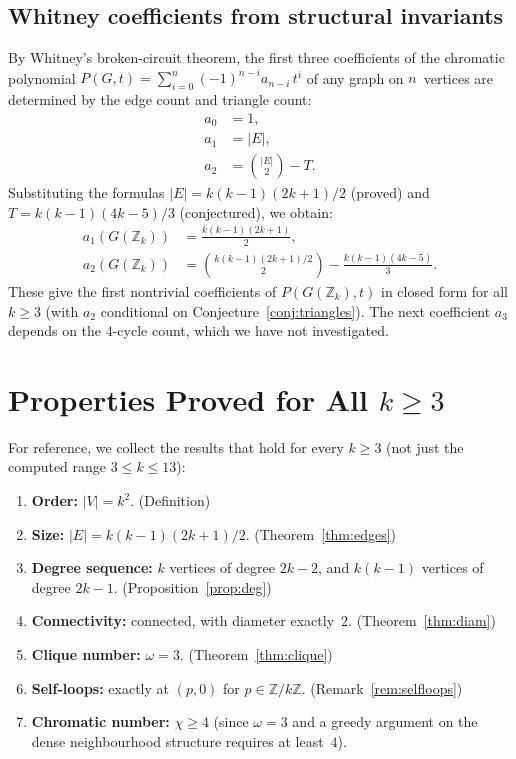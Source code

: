 \documentclass[12pt]{article}
\theoremstyle{definition}
\theoremstyle{remark}
\newcommand{\Z}{\mathbb{Z}}
\newcommand{\Zk}{\Z/k\Z}
\newcommand{\GZk}{G(\Z_k)}
\begin{document}
\subsection{Whitney coefficients from structural invariants}

By Whitney's broken-circuit theorem, the first three coefficients of the
chromatic polynomial $P(G, t) = \sum_{i=0}^{n} (-1)^{n-i} a_{n-i}\, t^i$
of any graph on $n$~vertices are determined by the edge count and triangle
count:
\begin{align}
  a_0 &= 1, \nonumber \\
  a_1 &= |E|, \label{eq:a1} \\
  a_2 &= \binom{|E|}{2} - T. \label{eq:a2}
\end{align}
Substituting the formulas $|E| = k(k{-}1)(2k{+}1)/2$ (proved) and
$T = k(k{-}1)(4k{-}5)/3$ (conjectured), we obtain:
\begin{align*}
  a_1(\GZk) &= \frac{k(k-1)(2k+1)}{2}, \\[4pt]
  a_2(\GZk) &= \binom{k(k{-}1)(2k{+}1)/2}{2} - \frac{k(k-1)(4k-5)}{3}.
\end{align*}
These give the first nontrivial coefficients of $P(\GZk, t)$ in closed form
for all $k \ge 3$ (with $a_2$ conditional on Conjecture~\ref{conj:triangles}).
The next coefficient $a_3$ depends on the $4$-cycle count, which we have not
investigated.


\section{Properties Proved for All $k \ge 3$}
\label{sec:summary}

For reference, we collect the results that hold for every $k \ge 3$ (not
just the computed range $3 \le k \le 13$):

\begin{enumerate}
  \item \textbf{Order:} $|V| = k^2$. \hfill (Definition)
  \item \textbf{Size:} $|E| = k(k{-}1)(2k{+}1)/2$. \hfill (Theorem~\ref{thm:edges})
  \item \textbf{Degree sequence:} $k$ vertices of degree $2k{-}2$, and
    $k(k{-}1)$ vertices of degree $2k{-}1$. \hfill (Proposition~\ref{prop:deg})
  \item \textbf{Connectivity:} connected, with diameter exactly~$2$.
    \hfill (Theorem~\ref{thm:diam})
  \item \textbf{Clique number:} $\omega = 3$. \hfill (Theorem~\ref{thm:clique})
  \item \textbf{Self-loops:} exactly at $(p, 0)$ for $p \in \Zk$.
    \hfill (Remark~\ref{rem:selfloops})
  \item \textbf{Chromatic number:} $\chi \ge 4$ (since
    $\omega = 3$ and a greedy argument on the dense neighbourhood structure
    requires at least~$4$).
\end{enumerate}
\end{document}
